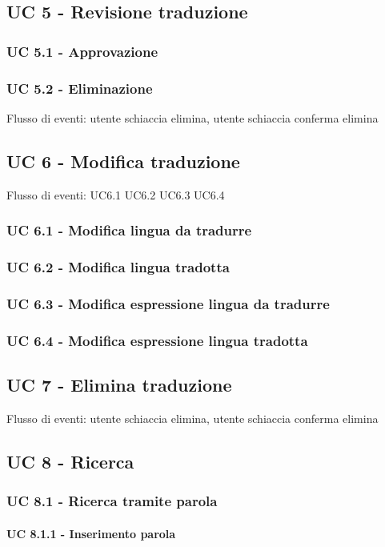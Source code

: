 \subsection*{UC 5 - Revisione traduzione}
    \subsubsection*{UC 5.1 - Approvazione}
    \subsubsection*{UC 5.2 - Eliminazione}
    Flusso di eventi: utente schiaccia elimina, utente schiaccia conferma elimina
\subsection*{UC 6 - Modifica traduzione}
Flusso di eventi: UC6.1 UC6.2 UC6.3 UC6.4   %
    \subsubsection*{UC 6.1 - Modifica lingua da tradurre}
    \subsubsection*{UC 6.2 - Modifica lingua tradotta}
    \subsubsection*{UC 6.3 - Modifica espressione lingua da tradurre}
    \subsubsection*{UC 6.4 - Modifica espressione lingua tradotta}
\subsection*{UC 7 - Elimina traduzione} %
Flusso di eventi: utente schiaccia elimina, utente schiaccia conferma elimina
\subsection*{UC 8 - Ricerca}
    \subsubsection*{UC 8.1 - Ricerca tramite parola}
        \paragraph*{UC 8.1.1 - Inserimento parola}
